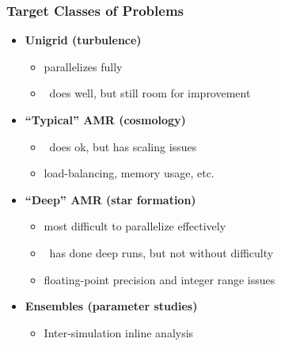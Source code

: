     \begin{frame}[fragile] \frametitle{Target Classes of Problems}

      \begin{itemize}
        \item {}\textbf{Unigrid (turbulence)}
        \begin{itemize}
          \item  {}parallelizes fully
          \item  {}\enzo\ does well, but still room for improvement
        \end{itemize}
        \item {}\textbf{``Typical'' AMR (cosmology)}
        \begin{itemize}
	   \item {}\enzo\ does ok, but has scaling issues
	   \item {}load-balancing, memory usage, etc.
        \end{itemize}
        \item {}\textbf{``Deep'' AMR (star formation)}
        \begin{itemize}
          \item {}most difficult to parallelize effectively
          \item {}\enzo\ has done deep runs, but not without difficulty
          \item {}floating-point precision and integer range issues
        \end{itemize}
        \item {}\textbf{Ensembles (parameter studies)}
        \begin{itemize}
           \item {}Inter-simulation inline analysis
        \end{itemize}
 
      \end{itemize}
\end{frame}

